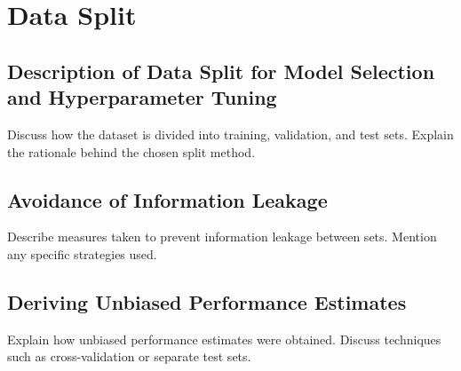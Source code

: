 \section{Data Split}

\subsection{Description of Data Split for Model Selection and Hyperparameter Tuning}
Discuss how the dataset is divided into training, validation, and test sets. Explain the rationale behind the chosen split method.

\subsection{Avoidance of Information Leakage}
Describe measures taken to prevent information leakage between sets. Mention any specific strategies used.

\subsection{Deriving Unbiased Performance Estimates}
Explain how unbiased performance estimates were obtained. Discuss techniques such as cross-validation or separate test sets.
